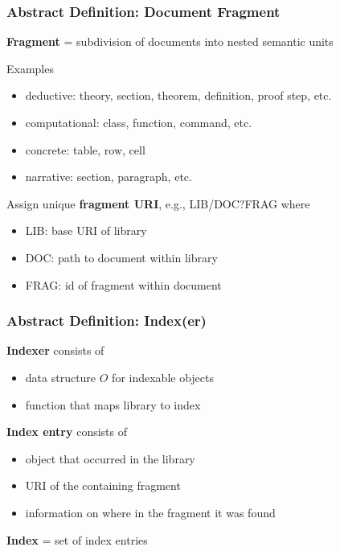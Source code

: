 \begin{frame}\frametitle{Abstract Definition: Document Fragment}
\textbf{Fragment} = subdivision of documents into nested semantic units

Examples
\begin{itemize}
\item deductive: theory, section, theorem, definition, proof step, etc.
\item computational: class, function, command, etc.
\item concrete: table, row, cell
\item narrative: section, paragraph, etc.
\end{itemize}

Assign unique \textbf{fragment URI}, e.g., LIB/DOC?FRAG where
\begin{itemize}
\item LIB: base URI of library 
\item DOC: path to document within library 
\item FRAG: id of fragment within document 
\end{itemize}
\end{frame}

\begin{frame}\frametitle{Abstract Definition: Index(er)}
\textbf{Indexer} consists of
\begin{itemize}
\item data structure $O$ for indexable objects
\item function that maps library to index 
\end{itemize}

\textbf{Index entry} consists of
\begin{itemize}
\item object that occurred in the library
\item URI of the containing fragment
\item information on where in the fragment it was found
\end{itemize}

\textbf{Index} = set of index entries
\end{frame}


